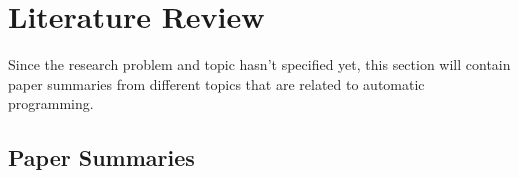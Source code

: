 \chapter{Literature Review}
\label{c:literatur}


Since the research problem and topic hasn't specified yet, this section will contain paper summaries from different topics that are related to automatic programming.


\section{Paper Summaries}
\label{c:literatur:summaries}

